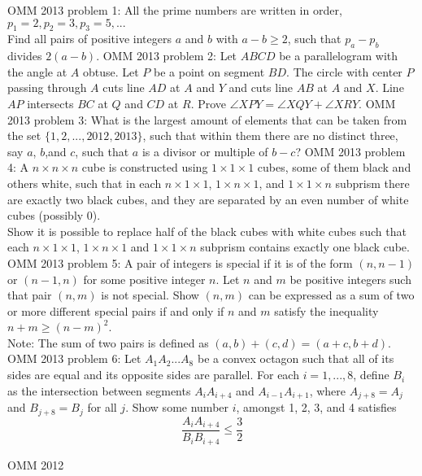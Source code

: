 OMM 2013 problem 1:  All the prime numbers are written in order, $p_1 = 2, p_2 = 3, p_3 = 5, ...$ \\
Find all pairs of positive integers $a$ and $b$ with $a - b \geq 2$, such that $p_a - p_b$ divides $2(a-b)$. 
OMM 2013 problem 2:  Let $ABCD$ be a parallelogram with the angle at $A$ obtuse. Let $P$ be a point on segment $BD$. The circle with center $P$ passing through $A$ cuts line $AD$ at $A$ and $Y$ and cuts line $AB$ at $A$ and $X$. Line $AP$ intersects $BC$ at $Q$ and $CD$ at $R$. Prove $\angle XPY = \angle XQY + \angle XRY$. 
OMM 2013 problem 3:  What is the largest amount of elements that can be taken from the set $\{1, 2, ... , 2012, 2013\}$, such that within them there are no distinct three, say $a$, $b$,and $c$, such that $a$ is a divisor or multiple of $b-c$? 
OMM 2013 problem 4:  A $n \times n \times n$ cube is constructed using $1 \times 1 \times 1$ cubes, some of them black and others white, such that in each $n \times 1 \times 1$, $1 \times n \times 1$, and $1 \times 1 \times n$ subprism there are exactly two black cubes, and they are separated by an even number of white cubes (possibly 0). \\
Show it is possible to replace half of the black cubes with white cubes such that each $n \times 1 \times 1$, $1 \times n \times 1$ and $1 \times 1 \times n$ subprism contains exactly one black cube. 
OMM 2013 problem 5:  A pair of integers is special if it is of the form $(n, n-1)$ or $(n-1, n)$ for some positive integer $n$. Let $n$ and $m$ be positive integers such that pair $(n, m)$ is not special. Show $(n, m)$ can be expressed as a sum of two or more different special pairs if and only if $n$ and $m$ satisfy the inequality $ n+m\geq (n-m)^2 $. \\
Note: The sum of two pairs is defined as $ (a, b)+(c, d) = (a+c, b+d) $. 
OMM 2013 problem 6:  Let $A_1A_2 ... A_8$ be a convex octagon such that all of its sides are equal and its opposite sides are parallel. For each $i = 1, ... , 8$, define $B_i$ as the intersection between segments $A_iA_{i+4}$ and $A_{i-1}A_{i+1}$, where $A_{j+8} = A_j$ and $B_{j+8} = B_j$ for all $j$. Show some number $i$, amongst 1, 2, 3, and 4 satisfies
\[ \frac{A_iA_{i+4}}{B_iB_{i+4}} \leq \frac{3}{2} \] 

OMM 2012 

